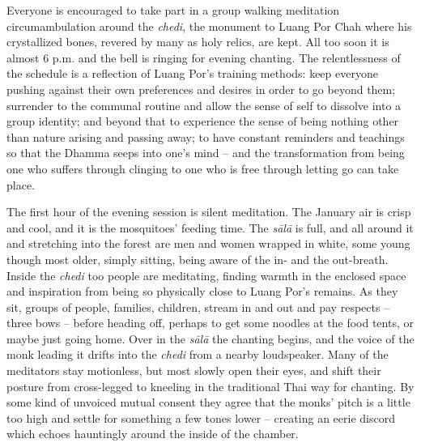 Everyone is encouraged to take part in a group walking meditation
circumambulation around the \emph{chedi}, the monument to Luang Por Chah
where his crystallized bones, revered by many as holy relics, are kept. 
All too soon it is almost 6 p.m. and the bell is ringing for evening
chanting. The relentlessness of the schedule is a reflection of Luang
Por's training methods: keep everyone pushing against their own
preferences and desires in order to go beyond them; surrender to the
communal routine and allow the sense of self to dissolve into a group
identity; and beyond that to experience the sense of being nothing other
than nature arising and passing away; to have constant reminders and
teachings so that the Dhamma seeps into one's mind -- and the
transformation from being one who suffers through clinging to one who is
free through letting go can take place. 

The first hour of the evening session is silent meditation. The January
air is crisp and cool, and it is the mosquitoes' feeding time. The
\emph{sālā} is full, and all around it and stretching into the forest
are men and women wrapped in white, some young though most older, simply
sitting, being aware of the in- and the out-breath. Inside the
\emph{chedi} too people are meditating, finding warmth in the enclosed
space and inspiration from being so physically close to Luang Por's
remains. As they sit, groups of people, families, children, stream in
and out and pay respects -- three bows -- before heading off, perhaps to
get some noodles at the food tents, or maybe just going home. Over in
the \emph{sālā} the chanting begins, and the voice of the monk leading
it drifts into the \emph{chedi} from a nearby loudspeaker. Many of the
meditators stay motionless, but most slowly open their eyes, and shift
their posture from cross-legged to kneeling in the traditional Thai way
for chanting. By some kind of unvoiced mutual consent they agree that
the monks' pitch is a little too high and settle for something a few
tones lower -- creating an eerie discord which echoes hauntingly around
the inside of the chamber. 

